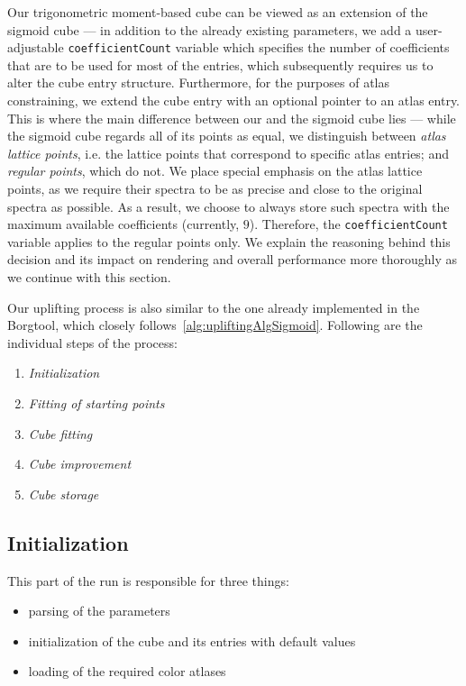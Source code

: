 Our trigonometric moment-based cube can be viewed as an extension of the sigmoid cube --- in addition to the already existing parameters, we add a user-adjustable \texttt{coefficientCount} variable which specifies the number of coefficients that are to be used for most of the entries, which subsequently requires us to alter the cube entry structure. Furthermore, for the purposes of atlas constraining, we extend the cube entry with an optional pointer to an atlas entry. This is where the main difference between our and the sigmoid cube lies --- while the sigmoid cube regards all of its points as equal, we distinguish between \emph{atlas lattice points}, i.e. the lattice points that correspond to specific atlas entries; and \emph{regular points}, which do not. We place special emphasis on the atlas lattice points, as we require their spectra to be as precise and close to the original spectra as possible. As a result, we choose to always store such spectra with the maximum available coefficients (currently, $9$). Therefore, the \texttt{coefficientCount} variable applies to the regular points only. We explain the reasoning behind this decision and its impact on rendering and overall performance more thoroughly as we continue with this section.

Our uplifting process is also similar to the one already implemented in the Borgtool, which closely follows~\cref{alg:upliftingAlgSigmoid}. Following are the individual steps of the process:
\begin{enumerate}
	\item \emph{Initialization}
	\item \emph{Fitting of starting points}
	\item \emph{Cube fitting}
	\item \emph{Cube improvement}
	\item \emph{Cube storage}
\end{enumerate}

\subsection{Initialization}

This part of the run is responsible for three things:
\begin{itemize}
	\item parsing of the parameters
	\item initialization of the cube and its entries with default values
	\item loading of the required color atlases
\end{itemize}

